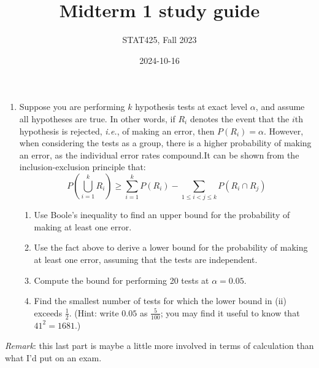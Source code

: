 \documentclass[
  letterpaper,
  DIV=11,
  numbers=noendperiod]{scrartcl}
\title{Midterm 1 study guide}
\author{STAT425, Fall 2023}
\date{2024-10-16}
\providecommand{\tightlist}{%
  \setlength{\itemsep}{0pt}\setlength{\parskip}{0pt}}\usepackage{longtable,booktabs,array}
\begin{document}
\maketitle

\pagestyle{fancy}  

\begin{enumerate}
\def\labelenumi{\arabic{enumi}.}
\tightlist
\item
  Suppose you are performing \(k\) hypothesis tests at exact level
  \(\alpha\), and assume all hypotheses are true. In other words, if
  \(R_i\) denotes the event that the \(i\)th hypothesis is rejected,
  \emph{i.e.}, of making an error, then \(P(R_i) = \alpha\). However,
  when considering the tests as a group, there is a higher probability
  of making an error, as the individual error rates compound.It can be
  shown from the inclusion-exclusion principle that: \[
  P\left(\bigcup_{i = 1}^k R_i\right) \geq \sum_{i = 1}^k P(R_i) - \sum_{1 \leq i < j \leq k} P(R_i \cap R_j)
  \]

  \begin{enumerate}
  \def\labelenumii{\roman{enumii}.}
  \tightlist
  \item
    Use Boole's inequality to find an upper bound for the probability of
    making at least one error.
  \item
    Use the fact above to derive a lower bound for the probability of
    making at least one error, assuming that the tests are independent.
  \item
    Compute the bound for performing 20 tests at \(\alpha = 0.05\).
  \item
    Find the smallest number of tests for which the lower bound in (ii)
    exceeds \(\frac{1}{2}\). (Hint: write \(0.05\) as \(\frac{5}{100}\);
    you may find it useful to know that \(41^2 = 1681\).)
  \end{enumerate}
\end{enumerate}

\emph{Remark}: this last part is maybe a little more involved in terms
of calculation than what I'd put on an exam.
\end{document}
